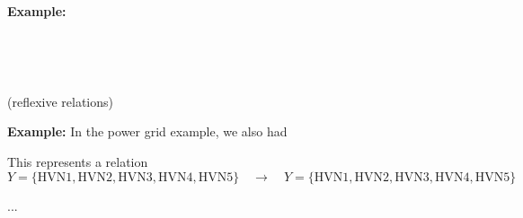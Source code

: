 \begin{frame}[fragile]

\textbf{Example:} 


\vfill \vfill \vfill \vfill \vfill \vfill 
\end{frame}







\

\


\begin{frame}[fragile] (reflexive relations)

\textbf{Example:} In the power grid example, we also had 

\vfill \vfill \vfill \vfill \vfill \vfill \vfill 

This represents a relation 
$$Y = \{ \text{HVN1}, \text{HVN2}, \text{HVN3}, \text{HVN4},  \text{HVN5} \} \quad \longrightarrow \quad Y = \{ \text{HVN1}, \text{HVN2}, \text{HVN3}, \text{HVN4},  \text{HVN5} \}$$

\end{frame}




\begin{frame}[fragile]{}


...

\end{frame}



